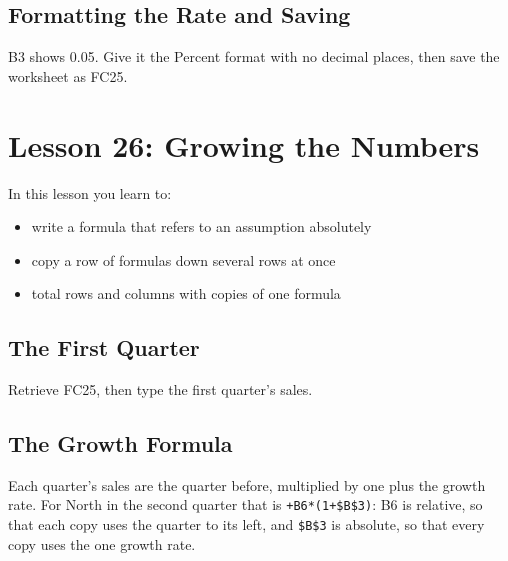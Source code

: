 \subsection{Formatting the Rate and Saving}
B3 shows 0.05.  Give it the Percent format with no decimal places, then
save the worksheet as FC25.

\begin{Keystrokes}
\end{Keystrokes}

\section{Lesson 26: Growing the Numbers}
In this lesson you learn to:
\begin{itemize}
\item write a formula that refers to an assumption absolutely
\item copy a row of formulas down several rows at once
\item total rows and columns with copies of one formula
\end{itemize}

\subsection{The First Quarter}
Retrieve FC25, then type the first quarter's sales.

\begin{Keystrokes}
\end{Keystrokes}

\subsection{The Growth Formula}
Each quarter's sales are the quarter before, multiplied by one plus the
growth rate.  For North in the second quarter that is
\texttt{+B6*(1+\$B\$3)}: B6 is relative, so that each copy uses the
quarter to its left, and \texttt{\$B\$3} is absolute, so that every copy
uses the one growth rate.

